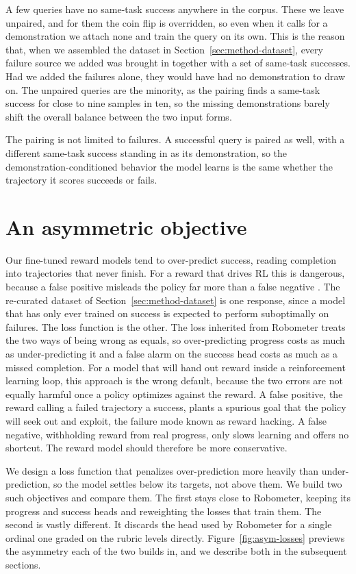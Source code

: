 A few queries have no same-task success anywhere in the corpus. These we leave unpaired, and for them the coin flip is overridden, so even when it calls for a demonstration we attach none and train the query on its own. This is the reason that, when we assembled the dataset in Section~\ref{sec:method-dataset}, every failure source we added was brought in together with a set of same-task successes. Had we added the failures alone, they would have had no demonstration to draw on. The unpaired queries are the minority, as the pairing finds a same-task success for close to nine samples in ten, so the missing demonstrations barely shift the overall balance between the two input forms.

The pairing is not limited to failures. A successful query is paired as well, with a different same-task success standing in as its demonstration, so the demonstration-conditioned behavior the model learns is the same whether the trajectory it scores succeeds or fails.

\section{An asymmetric objective}
\label{sec:method-loss}

Our fine-tuned reward models tend to over-predict success, reading completion into trajectories that never finish. For a reward that drives RL this is dangerous, because a false positive misleads the policy far more than a false negative \citep{gumbsch_demonstrations_2026}. The re-curated dataset of Section~\ref{sec:method-dataset} is one response, since a model that has only ever trained on success is expected to perform suboptimally on failures. The loss function is the other. The loss inherited from Robometer treats the two ways of being wrong as equals, so over-predicting progress costs as much as under-predicting it and a false alarm on the success head costs as much as a missed completion. For a model that will hand out reward inside a reinforcement learning loop, this approach is the wrong default, because the two errors are not equally harmful once a policy optimizes against the reward. A false positive, the reward calling a failed trajectory a success, plants a spurious goal that the policy will seek out and exploit, the failure mode known as reward hacking. A false negative, withholding reward from real progress, only slows learning and offers no shortcut. The reward model should therefore be more conservative.

We design a loss function that penalizes over-prediction more heavily than under-prediction, so the model settles below its targets, not above them. We build two such objectives and compare them. The first stays close to Robometer, keeping its progress and success heads and reweighting the losses that train them. The second is vastly different. It discards the head used by Robometer for a single ordinal one graded on the rubric levels directly. Figure~\ref{fig:asym-losses} previews the asymmetry each of the two builds in, and we describe both in the subsequent sections.

